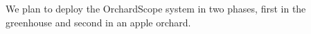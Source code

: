 We plan to deploy the OrchardScope system in two phases, first in the greenhouse and second in an apple orchard.  

